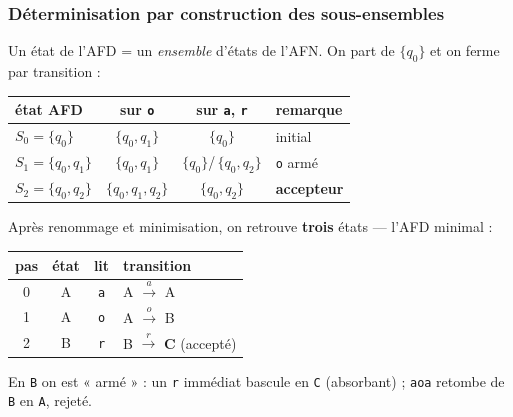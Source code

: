 \documentclass[11pt,a4paper]{scrartcl}
\begin{document}
\subsubsection{Déterminisation par construction des sous-ensembles}
Un état de l'AFD = un \emph{ensemble} d'états de l'AFN. On part de $\{q_0\}$ et on ferme
par transition :
\begin{center}\small
\begin{tabular}{@{}lccl@{}}
\toprule
état AFD & sur \texttt{o} & sur \texttt{a}, \texttt{r} & remarque\\\midrule
$S_0=\{q_0\}$ & $\{q_0,q_1\}$ & $\{q_0\}$ & initial\\
$S_1=\{q_0,q_1\}$ & $\{q_0,q_1\}$ & $\{q_0\}$/\,$\{q_0,q_2\}$ & \texttt o armé\\
$S_2=\{q_0,q_2\}$ & $\{q_0,q_1,q_2\}$ & $\{q_0,q_2\}$ & \textbf{accepteur}\\
\bottomrule
\end{tabular}
\end{center}
Après renommage et minimisation, on retrouve \textbf{trois} états — l'AFD minimal :
\begin{center}
\end{center}
\begin{exemple}
\begin{center}\small
\begin{tabular}{@{}cccl@{}}
\toprule pas & état & lit & transition\\\midrule
0 & A & \texttt a & A $\xrightarrow{a}$ A\\
1 & A & \texttt o & A $\xrightarrow{o}$ B\\
2 & B & \texttt r & B $\xrightarrow{r}$ \textbf{C} (accepté)\\
\bottomrule
\end{tabular}
\end{center}
En \texttt B on est « armé » : un \texttt r immédiat bascule en \texttt C (absorbant) ;
\texttt{aoa} retombe de \texttt B en \texttt A, rejeté.
\end{exemple}
\end{document}
